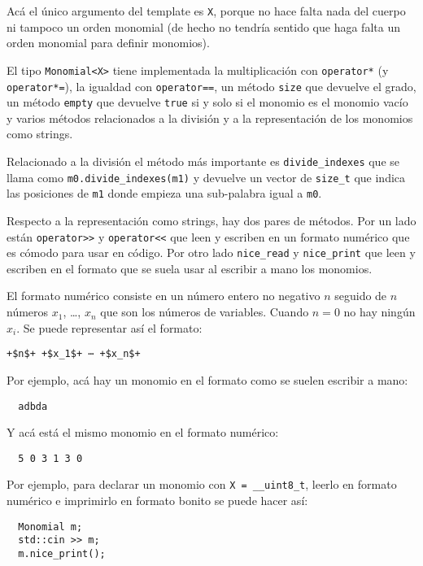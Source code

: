 \documentclass[12pt]{report}
\theoremstyle{customstyle}
\theoremstyle{factstyle}
\begin{document}
Acá el único argumento del template es \texttt{X}, porque no hace falta nada del cuerpo ni tampoco un orden monomial (de hecho no tendría sentido que haga falta un orden monomial para definir monomios).

El tipo \texttt{Monomial<X>} tiene implementada la multiplicación con \texttt{operator*} (y \texttt{operator*=}), la igualdad con \texttt{operator==}, un método \texttt{size} que devuelve el grado, un método \texttt{empty} que devuelve \texttt{true} si y solo si el monomio es el monomio vacío y varios métodos relacionados a la división y a la representación de los monomios como strings.

Relacionado a la división el método más importante es \texttt{divide\_indexes} que se llama como \texttt{m0.divide\_indexes(m1)} y devuelve un vector de \texttt{size\_t} que indica las posiciones de \texttt{m1} donde empieza una sub-palabra igual a \texttt{m0}.

Respecto a la representación como strings, hay dos pares de métodos. Por un lado están \texttt{operator>>} y \texttt{operator<<} que leen y escriben en un formato numérico que es cómodo para usar en código. Por otro lado \texttt{nice\_read} y \texttt{nice\_print} que leen y escriben en el formato que se suela usar al escribir a mano los monomios.

El formato numérico consiste en un número entero no negativo $n$ seguido de $n$ números $x_1$, …, $x_n$ que son los números de variables. Cuando $n = 0$ no hay ningún $x_i$. Se puede representar así el formato:

\begin{lstlisting}[escapechar=+]
  +$n$+ +$x_1$+ ⋯ +$x_n$+
\end{lstlisting}

Por ejemplo, acá hay un monomio en el formato como se suelen escribir a mano:

\begin{lstlisting}
  adbda
\end{lstlisting}

\noindent Y acá está el mismo monomio en el formato numérico:

\begin{lstlisting}
  5 0 3 1 3 0
\end{lstlisting}

Por ejemplo, para declarar un monomio con \texttt{X = \_\_uint8\_t}, leerlo en formato numérico e imprimirlo en formato bonito se puede hacer así:

\begin{verbatim}
  Monomial m;
  std::cin >> m;
  m.nice_print();
\end{verbatim}
\end{document}

